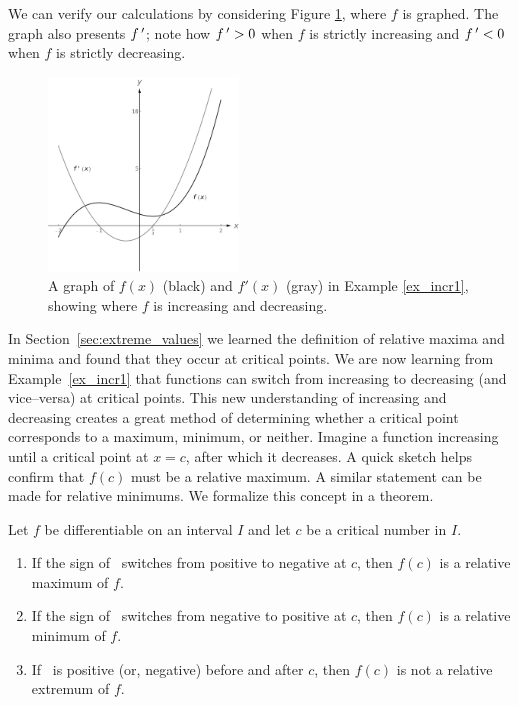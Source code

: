 \begin{example}
We can verify our calculations by considering Figure \ref{fig_behaviour_11}, where $f$ is graphed. The graph also presents $f\,'$; note how $f\,'>0$ when $f$ is strictly increasing and $f\,'<0$ when $f$ is strictly decreasing.

\begin{figure}[H]
	\begin{center}
			\includegraphics[width=0.45\textwidth]{fig_behaviour_11}
	\caption{A graph of $f(x)$ (black)  and $f'(x)$ (gray) in Example \ref{ex_incr1}, showing where $f$ is increasing and decreasing.}
	\label{fig_behaviour_11}
	\end{center}
\end{figure}

\end{example}

In Section~\ref{sec:extreme_values} we learned the definition of relative maxima and minima and found that they occur at critical points. We are now learning from Example~\ref{ex_incr1} that functions can switch from increasing to decreasing (and vice--versa) at critical points. This new understanding of increasing and decreasing creates a great method of determining whether a critical  point corresponds to a maximum, minimum, or neither. Imagine a function increasing until a critical point at $x=c$, after which it decreases. A quick sketch helps confirm that $f(c)$ must be a relative maximum. A similar statement can be made for relative minimums. We formalize this concept in a theorem.

\begin{theorem}\label{thm:first_der}
Let $f$ be differentiable on an interval $I$ and let $c$ be a critical number in $I$.
\begin{enumerate}
\item		If the sign of \fp\ switches from positive to negative at $c$, then $f(c)$ is a relative maximum of $f$.
\item		If the sign of \fp\ switches from negative to positive at $c$, then $f(c)$ is a relative minimum of $f$.
\item		If \fp\ is positive (or, negative) before and after $c$, then $f(c)$ is not a relative extremum of $f$.
\end{enumerate}
\end{theorem}

